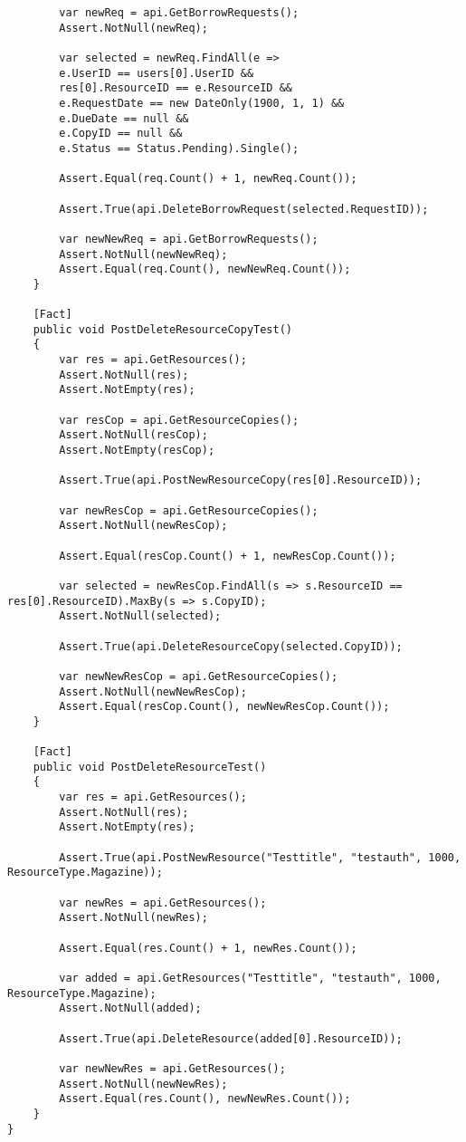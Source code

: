 \begin{verbatim}
        var newReq = api.GetBorrowRequests();
        Assert.NotNull(newReq);

        var selected = newReq.FindAll(e => 
        e.UserID == users[0].UserID && 
        res[0].ResourceID == e.ResourceID && 
        e.RequestDate == new DateOnly(1900, 1, 1) &&
        e.DueDate == null &&
        e.CopyID == null &&
        e.Status == Status.Pending).Single();

        Assert.Equal(req.Count() + 1, newReq.Count());

        Assert.True(api.DeleteBorrowRequest(selected.RequestID));

        var newNewReq = api.GetBorrowRequests();
        Assert.NotNull(newNewReq);
        Assert.Equal(req.Count(), newNewReq.Count());
    }
    
    [Fact]
    public void PostDeleteResourceCopyTest()
    {
        var res = api.GetResources();
        Assert.NotNull(res);
        Assert.NotEmpty(res);

        var resCop = api.GetResourceCopies();
        Assert.NotNull(resCop);
        Assert.NotEmpty(resCop);

        Assert.True(api.PostNewResourceCopy(res[0].ResourceID));

        var newResCop = api.GetResourceCopies();
        Assert.NotNull(newResCop);

        Assert.Equal(resCop.Count() + 1, newResCop.Count());

        var selected = newResCop.FindAll(s => s.ResourceID == res[0].ResourceID).MaxBy(s => s.CopyID);
        Assert.NotNull(selected);

        Assert.True(api.DeleteResourceCopy(selected.CopyID));

        var newNewResCop = api.GetResourceCopies();
        Assert.NotNull(newNewResCop);
        Assert.Equal(resCop.Count(), newNewResCop.Count());
    }

    [Fact]
    public void PostDeleteResourceTest()
    {
        var res = api.GetResources();
        Assert.NotNull(res);
        Assert.NotEmpty(res);

        Assert.True(api.PostNewResource("Testtitle", "testauth", 1000, ResourceType.Magazine));
        
        var newRes = api.GetResources();
        Assert.NotNull(newRes);

        Assert.Equal(res.Count() + 1, newRes.Count());

        var added = api.GetResources("Testtitle", "testauth", 1000, ResourceType.Magazine);
        Assert.NotNull(added);

        Assert.True(api.DeleteResource(added[0].ResourceID));

        var newNewRes = api.GetResources();
        Assert.NotNull(newNewRes);
        Assert.Equal(res.Count(), newNewRes.Count());
    }
}
\end{verbatim}